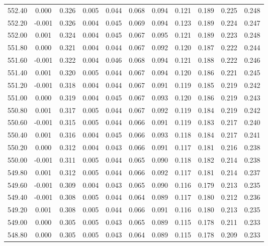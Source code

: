 \begin{longtable}{cccccccccc}
    552.40 &  0.000 &  0.326 &  0.005 &  0.044 &  0.068 &  0.094 &  0.121 &  0.189 &  0.225 &  0.248 \\
    552.20 & -0.001 &  0.326 &  0.004 &  0.045 &  0.069 &  0.094 &  0.123 &  0.189 &  0.224 &  0.247 \\
    552.00 &  0.001 &  0.324 &  0.004 &  0.045 &  0.067 &  0.095 &  0.121 &  0.189 &  0.223 &  0.248 \\
    551.80 &  0.000 &  0.321 &  0.004 &  0.044 &  0.067 &  0.092 &  0.120 &  0.187 &  0.222 &  0.244 \\
    551.60 & -0.001 &  0.322 &  0.004 &  0.046 &  0.068 &  0.094 &  0.121 &  0.188 &  0.222 &  0.246 \\
    551.40 &  0.001 &  0.320 &  0.005 &  0.044 &  0.067 &  0.094 &  0.120 &  0.186 &  0.221 &  0.245 \\
    551.20 & -0.001 &  0.318 &  0.004 &  0.044 &  0.067 &  0.091 &  0.119 &  0.185 &  0.219 &  0.242 \\
    551.00 &  0.000 &  0.319 &  0.004 &  0.045 &  0.067 &  0.093 &  0.120 &  0.186 &  0.219 &  0.243 \\
    550.80 &  0.001 &  0.317 &  0.005 &  0.044 &  0.067 &  0.092 &  0.119 &  0.184 &  0.219 &  0.242 \\
    550.60 & -0.001 &  0.315 &  0.005 &  0.044 &  0.066 &  0.091 &  0.119 &  0.183 &  0.217 &  0.240 \\
    550.40 &  0.001 &  0.316 &  0.004 &  0.045 &  0.066 &  0.093 &  0.118 &  0.184 &  0.217 &  0.241 \\
    550.20 &  0.000 &  0.312 &  0.004 &  0.043 &  0.066 &  0.091 &  0.117 &  0.181 &  0.216 &  0.238 \\
    550.00 & -0.001 &  0.311 &  0.005 &  0.044 &  0.065 &  0.090 &  0.118 &  0.182 &  0.214 &  0.238 \\
    549.80 &  0.001 &  0.312 &  0.005 &  0.044 &  0.066 &  0.092 &  0.117 &  0.181 &  0.214 &  0.237 \\
    549.60 & -0.001 &  0.309 &  0.004 &  0.043 &  0.065 &  0.090 &  0.116 &  0.179 &  0.213 &  0.235 \\
    549.40 & -0.001 &  0.308 &  0.005 &  0.044 &  0.064 &  0.089 &  0.117 &  0.180 &  0.212 &  0.236 \\
    549.20 &  0.001 &  0.308 &  0.005 &  0.044 &  0.066 &  0.091 &  0.116 &  0.180 &  0.213 &  0.235 \\
    549.00 &  0.000 &  0.305 &  0.005 &  0.043 &  0.065 &  0.089 &  0.115 &  0.178 &  0.211 &  0.233 \\
    548.80 &  0.000 &  0.305 &  0.005 &  0.043 &  0.064 &  0.089 &  0.115 &  0.178 &  0.209 &  0.233 \\

\end{longtable}
